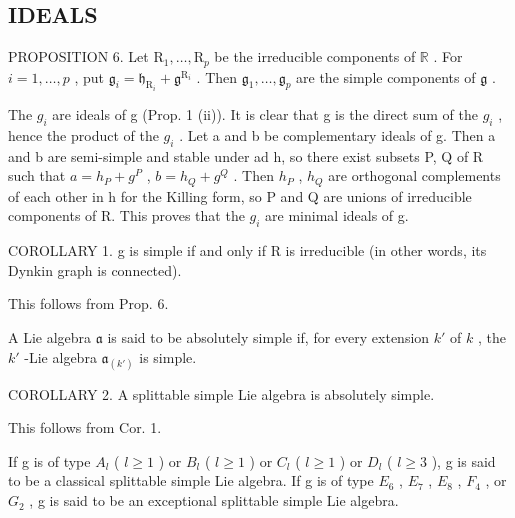 \subsection{IDEALS}

PROPOSITION 6. Let \(\mathrm{R}_1, \ldots, \mathrm{R}_p\) be the irreducible components of \(\mathbb{R}\) . For \(i = 1, \ldots, p\) , put \(\mathfrak{g}_i = \mathfrak{h}_{\mathrm{R}_i} + \mathfrak{g}^{\mathrm{R}_i}\) . Then \(\mathfrak{g}_1, \ldots, \mathfrak{g}_p\) are the simple components of \(\mathfrak{g}\) .

The \(g_{i}\) are ideals of g (Prop. 1 (ii)). It is clear that g is the direct sum of the \(g_{i}\) , hence the product of the \(g_{i}\) . Let a and b be complementary ideals of g. Then a and b are semi-simple and stable under ad h, so there exist subsets P, Q of R such that \(a = h_{P} + g^{P}\) , \(b = h_{Q} + g^{Q}\) . Then \(h_{P}\) , \(h_{Q}\) are orthogonal complements of each other in h for the Killing form, so P and Q are unions of irreducible components of R. This proves that the \(g_{i}\) are minimal ideals of g.

COROLLARY 1. g is simple if and only if R is irreducible (in other words, its Dynkin graph is connected).

This follows from Prop. 6.

A Lie algebra \(\mathfrak{a}\) is said to be absolutely simple if, for every extension \(k'\) of \(k\) , the \(k'\) -Lie algebra \(\mathfrak{a}_{(k')}\) is simple.

COROLLARY 2. A splittable simple Lie algebra is absolutely simple.

This follows from Cor. 1.

If g is of type \(A_{l}\) ( \(l \geq 1\) ) or \(B_{l}\) ( \(l \geq 1\) ) or \(C_{l}\) ( \(l \geq 1\) ) or \(D_{l}\) ( \(l \geq 3\) ), g is said to be a classical splittable simple Lie algebra. If g is of type \(E_{6}\) , \(E_{7}\) , \(E_{8}\) , \(F_{4}\) , or \(G_{2}\) , g is said to be an exceptional splittable simple Lie algebra.

